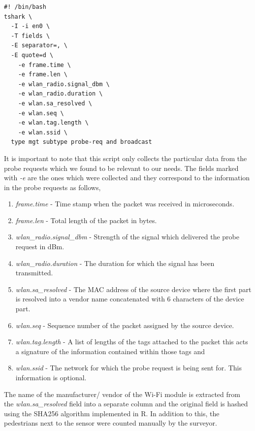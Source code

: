 \begin{verbatim}
#! /bin/bash
tshark \
  -I -i en0 \
  -T fields \
  -E separator=, \
  -E quote=d \
    -e frame.time \
    -e frame.len \
    -e wlan_radio.signal_dbm \
    -e wlan_radio.duration \
    -e wlan.sa_resolved \
    -e wlan.seq \
    -e wlan.tag.length \
    -e wlan.ssid \
  type mgt subtype probe-req and broadcast
\end{verbatim}

It is important to note that this script only collects the particular data from the probe requests which we found to be relevant to our needs. 
The fields marked with \textit{-e} are the ones which were collected and they correspond to the information in the probe requests as follows,

\begin{enumerate}[rightmargin = 0.5em, leftmargin = 0.5em]
  \itemsep-0.25em
  \item \textit{frame.time} - Time stamp when the packet was received in microseconds.
  \item \textit{frame.len} - Total length of the packet in bytes.
  \item \textit{wlan\_radio.signal\_dbm} - Strength of the signal which delivered the probe request in dBm.
  \item \textit{wlan\_radio.duration} - The duration for which the signal has been transmitted.
  \item \textit{wlan.sa\_resolved} - The MAC address of the source device where the first part is resolved into a vendor name concatenated with 6 characters of the device part.
  \item \textit{wlan.seq} - Sequence number of the packet assigned by the source device.
  \item \textit{wlan.tag.length} - A list of lengths of the tags attached to the packet this acts a signature of the information contained within those tags and
  \item \textit{wlan.ssid} - The network for which the probe request is being sent for. This information is optional.
\end{enumerate}

The name of the manufacturer/ vendor of the Wi-Fi module  is extracted from the \textit{wlan.sa\_resolved} field into a separate column and the original field is hashed using the SHA256 algorithm implemented in R.
In addition to this, the pedestrians next to the sensor were counted manually by the surveyor.

